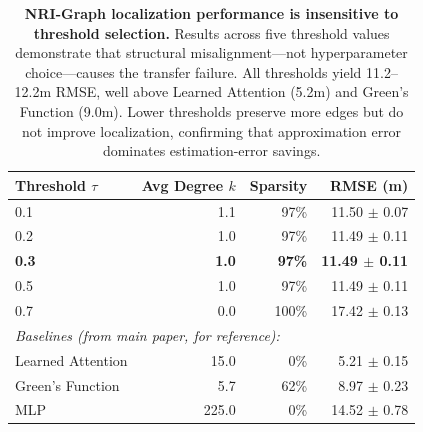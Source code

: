 \begin{table}[h]
\centering
\caption{\textbf{NRI-Graph localization performance is insensitive to threshold 
selection.} Results across five threshold values demonstrate that structural 
misalignment---not hyperparameter choice---causes the transfer failure. All 
thresholds yield 11.2--12.2m RMSE, well above Learned Attention (5.2m) and 
Green's Function (9.0m). Lower thresholds preserve more edges but do not improve 
localization, confirming that approximation error dominates estimation-error 
savings.}
\label{tab:threshold-sensitivity}
\begin{tabular}{lrrr}
\toprule
Threshold $\tau$ & Avg Degree $k$ & Sparsity & RMSE (m) \\
\midrule
0.1 & 1.1 & 97\% & 11.50 $\pm$ 0.07 \\
0.2 & 1.0 & 97\% & 11.49 $\pm$ 0.11 \\
\textbf{0.3} & \textbf{1.0} & \textbf{97\%} & \textbf{11.49 $\pm$ 0.11} \\
0.5 & 1.0 & 97\% & 11.49 $\pm$ 0.11 \\
0.7 & 0.0 & 100\% & 17.42 $\pm$ 0.13 \\
\midrule
\multicolumn{4}{l}{\textit{Baselines (from main paper, for reference):}} \\
Learned Attention & 15.0 & 0\% & 5.21 $\pm$ 0.15 \\
Green's Function & 5.7 & 62\% & 8.97 $\pm$ 0.23 \\
MLP & 225.0 & 0\% & 14.52 $\pm$ 0.78 \\
\bottomrule
\end{tabular}
\end{table}

